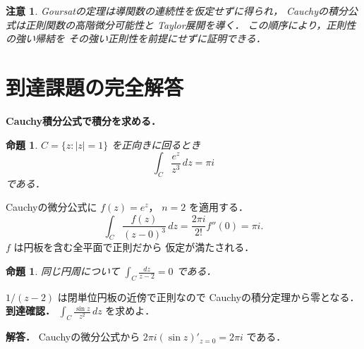 \documentclass[a5paper,10pt,onecolumn]{jsarticle}
\makeatletter
\theoremstyle{mathnotetheorem}
\newtheorem{proposition}[theorem]{命題}
\newtheorem{remark}[theorem]{注意}
\renewcommand{\proofname}{証明}
\renewenvironment{proof}[1][\proofname]{%
  \par\pushQED{\qed}\normalfont\topsep4\p@\@plus2\p@\relax
  \trivlist\item[\hskip\labelsep\bfseries #1]\ignorespaces
}{\popQED\endtrivlist\@endpefalse}
\makeatother
\begin{document}
\begin{remark}
Goursatの定理は導関数の連続性を仮定せずに得られ，
Cauchyの積分公式は正則関数の高階微分可能性と
Taylor展開を導く．
この順序により，正則性の強い帰結を
その強い正則性を前提にせずに証明できる．
\end{remark}


\section{到達課題の完全解答}
\noindent\textbf{Cauchy積分公式で積分を求める．}
\begin{proposition}
$C=\{z:|z|=1\}$ を正向きに回るとき
\[
\int_C\frac{e^z}{z^3}\,dz=\pi i
\]
である．
\end{proposition}
\begin{proof}
Cauchyの微分公式に $f(z)=e^z$，
$n=2$ を適用する．
\[
\int_C\frac{f(z)}{(z-0)^3}\,dz
=\frac{2\pi i}{2!}f''(0)
=\pi i.
\]
$f$ は円板を含む全平面で正則だから
仮定が満たされる．
\end{proof}
\begin{proposition}
同じ円周について
$\int_C \frac{dz}{z-2}=0$ である．
\end{proposition}
\begin{proof}
$1/(z-2)$ は閉単位円板の近傍で正則なので
Cauchyの積分定理から零となる．
\end{proof}
\noindent\textbf{到達確認．}
$\int_C\frac{\sin z}{z^2}\,dz$ を求めよ．
\par\noindent\textbf{解答．}
Cauchyの微分公式から
$2\pi i(\sin z)'_{z=0}=2\pi i$ である．
\end{document}
